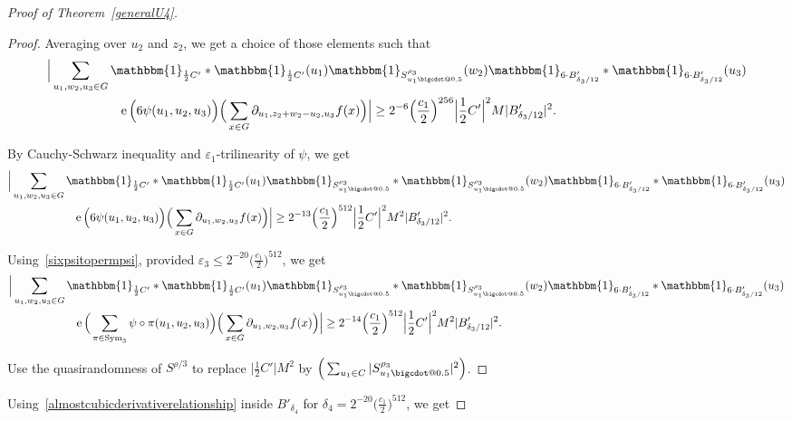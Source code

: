 \documentclass[a4paper,11pt]{article}
\makeatletter
\numberwithin{theorem}{section}
\theoremstyle{definition}
\newcommand\id{\mathbbm{1}}
\newcommand{\on}[1]{
	\operatorname{#1}
}
\newcommand*\bcdot{\mathpalette\bigcdot@{0.5}}
\newcommand*\bigcdot@[2]{\mathbin{\vcenter{\hbox{\scalebox{#2}{$\m@th#1\bullet$}}}}}
\makeatother
\begin{document}
\begin{proof}[Proof of Theorem~\ref{generalU4}]
\begin{proof}
    Averaging over $u_2$ and $z_2$, we get a choice of those elements such that
     \begin{align*}&\Big|\sum_{u_1, w_2, u_3 \in G} \id_{\frac{1}{2}C'} \ast \id_{\frac{1}{2}C'}(u_1)
    \id_{S^{\rho_3}_{u_1 \bcdot}}(w_2)
    \id_{6 \cdot B'_{\delta_3/{12}}} \ast \id_{6 \cdot B'_{\delta_3/12}}(u_3)\\
        &\hspace{2cm}\on{e}\Big(6\psi(u_1, u_2, u_3)\Big) \Big(\sum_{x \in G} \partial_{u_1, z_2 + w_2 - u_2, u_3} f(x)\Big) \Big| \geq 2^{-6}\Big(\frac{c_1}{2}\Big)^{256}  \Big|\frac{1}{2}C'\Big|^2 M |B'_{\delta_3/12}|^2.
        \end{align*}

    By Cauchy-Schwarz inequality and $\varepsilon_1$-trilinearity of $\psi$, we get
    \begin{align*}&\Big|\sum_{u_1, w_2, u_3 \in G} \id_{\frac{1}{2}C'} \ast \id_{\frac{1}{2}C'}(u_1)
    \id_{S^{\rho_3}_{u_1 \bcdot}} \ast \id_{S^{\rho_3}_{u_1 \bcdot}}(w_2)
    \id_{6 \cdot B'_{\delta_3/{12}}} \ast \id_{6 \cdot B'_{\delta_3/12}}(u_3)\\
        &\hspace{2cm}\on{e}\Big(6\psi(u_1, u_2, u_3)\Big) \Big(\sum_{x \in G} \partial_{u_1, w_2, u_3} f(x)\Big) \Big| \geq 2^{-13}\Big(\frac{c_1}{2}\Big)^{512}  \Big|\frac{1}{2}C'\Big|^2 M^2 |B'_{\delta_3/12}|^2.
        \end{align*}

    Using~\eqref{sixpsitopermpsi}, provided $\varepsilon_3 \leq 2^{-20}\Big(\frac{c_1}{2}\Big)^{512}$, we get
    \begin{align*}&\Big|\sum_{u_1, w_2, u_3 \in G} \id_{\frac{1}{2}C'} \ast \id_{\frac{1}{2}C'}(u_1)
    \id_{S^{\rho_3}_{u_1 \bcdot}} \ast \id_{S^{\rho_3}_{u_1 \bcdot}}(w_2)
    \id_{6 \cdot B'_{\delta_3/{12}}} \ast \id_{6 \cdot B'_{\delta_3/12}}(u_3)\\
        &\hspace{2cm}\on{e}\Big(\sum_{\pi \in \on{Sym}_3}\psi\circ\pi(u_1, u_2, u_3)\Big) \Big(\sum_{x \in G} \partial_{u_1, w_2, u_3} f(x)\Big) \Big| \geq 2^{-14}\Big(\frac{c_1}{2}\Big)^{512}  \Big|\frac{1}{2}C'\Big|^2 M^2 |B'_{\delta_3/12}|^2.
        \end{align*}

    Use the quasirandomness of $S^{\rho/3}$ to replace $\Big|\frac{1}{2}C'\Big| M^2$ by $\Big(\sum_{u_1 \in C} |S^{\rho_3}_{u_1 \bcdot}|^2\Big)$.\end{proof}

    Using~\eqref{almostcubicderivativerelationship} inside $B'_{\delta_4}$ for $\delta_4 = 2^{-20}\Big(\frac{c_1}{2}\Big)^{512} $, we get
    

\end{proof}
\end{document}
